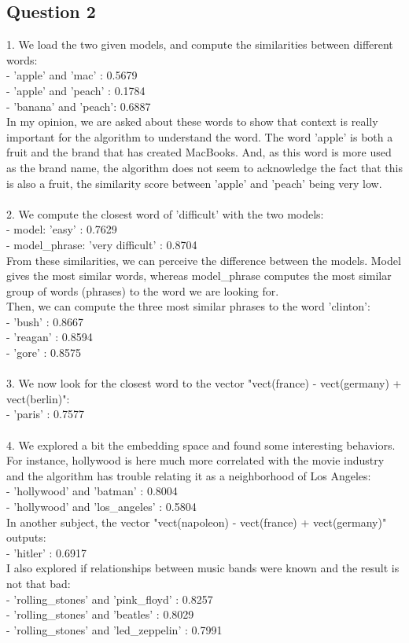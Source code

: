 \documentclass[11pt, oneside]{article}   	%
\begin{document}
\subsection{Question 2}
1. We load the two given models, and compute the similarities between different words:\\
\indent - 'apple' and 'mac' : 0.5679\\
\indent - 'apple' and 'peach' : 0.1784\\
\indent - 'banana'  and 'peach': 0.6887\\
In my opinion, we are asked about these words to show that context is really important for the algorithm to understand the word. The word 'apple' is both a fruit and the brand that has created MacBooks. And, as this word is more used as the brand name, the algorithm does not seem to acknowledge the fact that this is also a fruit, the similarity score between 'apple' and 'peach' being very low.\\
\\
2. We compute the closest word of 'difficult' with the two models:\\
\indent - model: 'easy' : 0.7629\\
\indent - model\_phrase: 'very difficult' : 0.8704\\
From these similarities, we can perceive the difference between the models. Model gives the most similar words, whereas model\_phrase computes the most similar group of words (phrases) to the word we are looking for.\\
Then, we can compute the three most similar phrases to the word 'clinton':\\
\indent - 'bush' : 0.8667\\
\indent - 'reagan' : 0.8594\\
\indent - 'gore' : 0.8575\\
\\
3. We now look for the closest word to the vector "vect(france) - vect(germany) + vect(berlin)":\\
\indent - 'paris' : 0.7577\\
\\
4. We explored a bit the embedding space and found some interesting behaviors.\\
For instance, hollywood is here much more correlated with the movie industry and the algorithm has trouble relating it as a neighborhood of Los Angeles:\\
\indent - 'hollywood' and 'batman' : 0.8004\\
\indent - 'hollywood' and 'los\_angeles' : 0.5804\\
In another subject, the vector "vect(napoleon) - vect(france) + vect(germany)" outputs:\\
\indent - 'hitler' : 0.6917\\
I also explored if relationships between music bands were known and the result is not that bad:\\
\indent - 'rolling\_stones' and 'pink\_floyd' : 0.8257\\
\indent - 'rolling\_stones' and 'beatles' : 0.8029\\
\indent - 'rolling\_stones' and 'led\_zeppelin' : 0.7991
\end{document}
